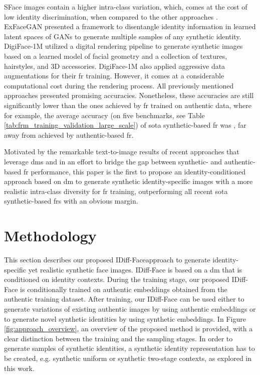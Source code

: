 \documentclass[10pt,twocolumn,letterpaper]{article}
\newcommand{\approachname}{IDiff-Face }
\newcommand{\approachnamewithoutspace}{IDiff-Face}
\begin{document}
SFace \cite{Boutros2022SFace} images contain a higher intra-class variation, which, comes at the cost of low identity discrimination, when compared to the other approaches \cite{FBoutros2022USynthFace}. 
ExFaceGAN \cite{ExFaceGAN} presented a framework to disentangle identity information in
learned latent spaces of GANs to generate multiple samples of any synthetic identity. 
DigiFace-1M \cite{DigiFace1M} utilized a digital rendering pipeline to generate synthetic images based on a learned model of facial geometry and a collection of textures, hairstyles, and 3D accessories. DigiFace-1M \cite{DigiFace1M} also applied aggressive data augmentations for their \acrshort{fr} training. However, it comes at a considerable computational cost during the rendering process. 
All previously mentioned approaches presented promising accuracies. Nonetheless, these accuracies are still significantly lower than the ones achieved by \acrshort{fr} trained on authentic data, where for example, the average accuracy (on five benchmarks, see Table \ref{tab:frm_training_validation_large_scale}) of \acrshort{sota} synthetic-based \acrshort{fr} was , far away from  achieved by authentic-based \acrshort{fr}.

Motivated by the remarkable text-to-image results of recent approaches that leverage \acrshort{dm}s \cite{Rombach2021, Ramesh2022, Saharia2022} and in an effort to bridge the gap between synthetic- and authentic-based \acrshort{fr} performance, this paper is the first to propose an identity-conditioned approach based on \acrshort{dm} to generate synthetic identity-specific images with a more realistic intra-class diversity for \acrshort{fr} training, outperforming all recent \acrshort{sota} synthetic-based \acrshort{fr}s with an obvious margin. 


\vspace{-3mm}
\section{Methodology }
\vspace{-2mm}
This section describes our proposed \approachnamewithoutspace approach to generate identity-specific yet realistic synthetic face images. \approachname is based on a \acrshort{dm} that is conditioned on identity contexts. During the training stage, our proposed \approachname is conditionally trained on authentic embeddings obtained from the authentic training dataset. After training, our \approachname can be used either to generate variations of existing authentic images by using authentic embeddings or to generate novel synthetic identities by using synthetic embeddings. In Figure \ref{fig:approach_overview}, an overview of the proposed method is provided, with a clear distinction between the training and the sampling stages. In order to generate samples of synthetic identities, a synthetic identity representation has to be created, e.g. synthetic uniform or synthetic two-stage contexts, as explored in this work.
\vspace{-1mm}
\end{document}
